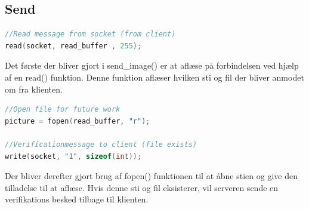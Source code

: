 \documentclass[12pt,fleqn,a4paper]{report}
\begin{document}
\subsection{Send}
\begin{framed}
\begin{lstlisting}[language=C++]
//Read message from socket (from client)
read(socket, read_buffer , 255);
\end{lstlisting}
\end{framed}
 Det første der bliver gjort i send\_image() er at aflæse på forbindelsen ved hjælp af en read() funktion. Denne funktion aflæser hvilken sti og fil der bliver anmodet om fra klienten. 
 
\begin{framed}
\begin{lstlisting}[language=C++]
//Open file for future work
picture = fopen(read_buffer, "r");

//Verificationmessage to client (file exists)
write(socket, "1", sizeof(int));
\end{lstlisting}
\end{framed}
Der bliver derefter gjort brug af fopen() funktionen til at åbne stien og give den tilladelse til at aflæse.
Hvis denne sti og fil eksisterer, vil serveren sende en verifikations besked tilbage til klienten.
\end{document}

